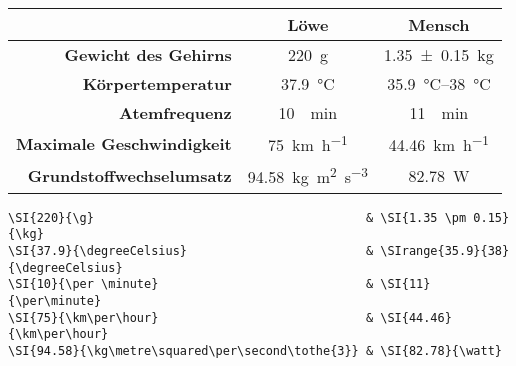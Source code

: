 \begin{frame}[fragile]
	\Losung
	\begin{outputbox}
		\vspace{-0.1cm}
		\begin{center}
			\begin{tabular}{rcc}
				\hline
				&	\textbf{Löwe}										& \textbf{Mensch} 						\\ \hline
				\textbf{Gewicht des Gehirns}		&	\SI{220}{\g}										& \SI{1.35 \pm 0.15}{\kg}				\\ 
				\textbf{Körpertemperatur}			&	\SI{37.9}{\degreeCelsius}							& \SIrange{35.9}{38}{\degreeCelsius}	\\
				\textbf{Atemfrequenz}				&	\SI{10}{\per \minute}								& \SI{11}{\per\minute} 					\\
				\textbf{Maximale Geschwindigkeit}	&	\SI{75}{\km\per\hour}								& \SI{44.46}{\km\per\hour} 				\\ 
				\textbf{Grundstoffwechselumsatz}	&	\SI{94.58}{\kg\metre\squared\per\second\tothe{3}}	&  \SI{82.78}{\watt}\\
				\hline
			\end{tabular}
		\end{center}
		\vspace{-0.1cm}
	\end{outputbox}

	\Code
	\begin{lstlisting}[tabsize=1,breaklines=false]
\SI{220}{\g}                                      & \SI{1.35 \pm 0.15}{\kg}
\SI{37.9}{\degreeCelsius}                         & \SIrange{35.9}{38}{\degreeCelsius}
\SI{10}{\per \minute}                             & \SI{11}{\per\minute}
\SI{75}{\km\per\hour}                             & \SI{44.46}{\km\per\hour}
\SI{94.58}{\kg\metre\squared\per\second\tothe{3}} & \SI{82.78}{\watt}
	\end{lstlisting}
\end{frame}
